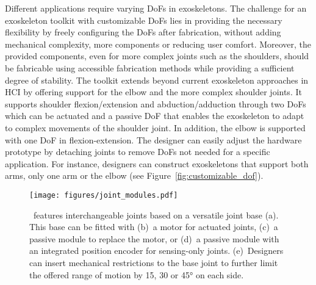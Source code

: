 Different applications require varying DoFs in exoskeletons.
The challenge for an exoskeleton toolkit with customizable DoFs lies in providing the necessary flexibility by freely configuring the DoFs after fabrication, without adding mechanical complexity, more components or reducing user comfort. Moreover, the provided components, even for more complex joints such as the shoulders, should be fabricable using accessible fabrication methods while providing a sufficient degree of stability.
The toolkit extends beyond current exoskeleton approaches in HCI by offering support for the elbow and the more complex shoulder joints. It supports shoulder flexion/extension and abduction/adduction through two DoFs which can be actuated and a passive DoF that enables the exoskeleton to adapt to complex movements of the shoulder joint. 
In addition, the elbow is supported with one DoF in flexion-extension. 
The designer can easily adjust the hardware prototype by detaching joints to remove DoFs not needed for a specific application. For instance, designers can construct exoskeletons that support both arms, only one arm or the elbow (see Figure~\ref{fig:customizable_dof}).

\begin{figure*}[tb]
    \centering
    \texttt{[image: figures/joint\_modules.pdf]}
    \caption{\toolkit~features interchangeable joints based on a versatile joint base (a). This base can be fitted with (b)~a motor for actuated joints, (c)~a passive module to replace the motor, or (d)~a passive module with an integrated position encoder for sensing-only joints. (e)~Designers can insert mechanical restrictions to the base joint to further limit the offered range of motion by 15, 30 or 45° on each side.}
    \label{fig:joint_modules}
\end{figure*}

